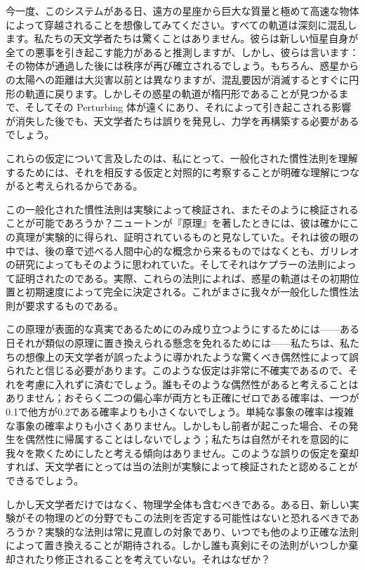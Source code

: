 \documentclass[a4paper,11pt,openany]{ltjsbook}
\begin{document}
今一度、このシステムがある日、遠方の星座から巨大な質量と極めて高速な物体によって穿越されることを想像してみてください。すべての軌道は深刻に混乱します。私たちの天文学者たちは驚くことはありません。彼らは新しい恒星自身が全ての悪事を引き起こす能力があると推測しますが、しかし、彼らは言います：その物体が通過した後には秩序が再び確立されるでしょう。もちろん、惑星からの太陽への距離は大災害以前とは異なりますが、混乱要因が消滅するとすぐに円形の軌道に戻ります。しかしその惑星の軌道が楕円形であることが見つかるまで、そしてその Perturbing 体が遠くにあり、それによって引き起こされる影響が消失した後でも、天文学者たちは誤りを発見し、力学を再構築する必要があるでしょう。

これらの仮定について言及したのは、私にとって、一般化された慣性法則を理解するためには、それを相反する仮定と対照的に考察することが明確な理解につながると考えられるからである。

この一般化された慣性法則は実験によって検証され、またそのように検証されることが可能であろうか？ニュートンが『原理』を著したときには、彼は確かにこの真理が実験的に得られ、証明されているものと見なしていた。それは彼の眼の中では、後の章で述べる人間中心的な概念から来るものではなくとも、ガリレオの研究によってもそのように思われていた。そしてそれはケプラーの法則によって証明されたのである。実際、これらの法則によれば、惑星の軌道はその初期位置と初期速度によって完全に決定される。これがまさに我々が一般化した慣性法則が要求するものである。

この原理が表面的な真実であるためにのみ成り立つようにするためには——ある日それが類似の原理に置き換えられる懸念を免れるためには——私たちは、私たちの想像上の天文学者が誤ったように導かれたような驚くべき偶然性によって誤られたと信じる必要があります。このような仮定は非常に不確実であるので、それを考慮に入れずに済むでしょう。誰もそのような偶然性があると考えることはありません；おそらく二つの偏心率が両方とも正確にゼロである確率は、一つが0.1で他方が0.2である確率よりも小さくないでしょう。単純な事象の確率は複雑な事象の確率よりも小さくありません。しかしもし前者が起こった場合、その発生を偶然性に帰属することはしないでしょう；私たちは自然がそれを意図的に我々を欺くためにしたと考える傾向はありません。このような誤りの仮定を棄却すれば、天文学者にとっては当の法則が実験によって検証されたと認めることができるでしょう。

しかし天文学者だけではなく、物理学全体も含むべきである。ある日、新しい実験がその物理のどの分野でもこの法則を否定する可能性はないと恐れるべきであろうか？実験的な法則は常に見直しの対象であり、いつでも他のより正確な法則によって置き換えることが期待される。しかし誰も真剣にその法則がいつしか棄却されたり修正されることを考えていない。それはなぜか？
\end{document}
